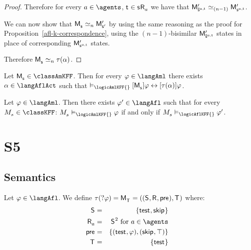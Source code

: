 \begin{proof}
Therefore for every $\agentA \in \agents$, $\aStateT \in \aStateS \aAccessibility{\agentA}$ we have that $\aPModelP{\aPStateS[\agentA,\aStateT]} \bisimilar[(n - 1)] \aPModelP{\aStateS[\agentA,\aStateT]}$.

We can now show that $\aPModel{\aStateS} \bisimilar[n] \aPModelP{\aStateSP}$ by using the same reasoning as the proof for Proposition~\ref{afl-k-correspondence}, using the $(n - 1)$-bisimilar $\aPModelP{\aPStateS[\agentA,\aStateT]}$ states in place of corresponding $\aPModelP{\aStateS[\agentA,\aStateT]}$ states.

Therefore $\aPModel{\aStateS} \bisimilar[n] \tau(\alpha)$.
\end{proof}

\begin{corollary}
Let $\aPModel{\aStateS} \in \classAmKFF$.
Then for every $\phi \in \langAml$ there exists $\alpha \in \langAflAct$ such that $\entails_\logicAmlKFF{} \actionA{\aPModel{\aStateS}} \phi \iff \actionA{\tau(\alpha)} \phi$.
\end{corollary}

\begin{corollary}
Let $\phi \in \langAml$. 
Then there exists $\phi' \in \langAfl$ such that for every $\kPModel{\kStateS} \in \classKFF$: $\kPModel{\kStateS} \entails_\logicAmlKFF{} \phi$ if and only if $\kPModel{\kStateS} \entails_\logicAflKFF{} \phi'$.
\end{corollary}

\section{S5}

\subsection{Semantics}

\begin{definition}[Test]\label{afl-s-test}
Let $\phi \in \langAfl$. 
We define $\tau(\test{\phi}) = \aPModel{\aStatesT} = \aPModelTuple{\aStatesT}$ where:
\begin{eqnarray*}
    \aStates &=& \{\aStateTest, \aStateSkip\}\\
    \aAccessibility{\agentA} &=& \aStates^2 \text{ for } \agentA \in \agents\\
    \aPrecondition &=& \{(\aStateTest, \phi), (\aStateSkip, \top)\}\\
    \aStatesT &=& \{\aStateTest\}
\end{eqnarray*}
\end{definition}

